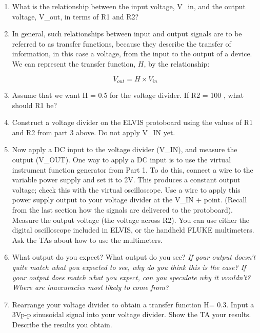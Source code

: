 \documentclass{article}
\begin{document}
\begin{enumerate}
	\item What is the relationship between the input voltage, V\_in, and the output voltage, V\_out, in terms of R1 and R2?
	\item In general, such relationships between input and output signals are to be referred to as transfer functions, because they describe the transfer of information, in this case a voltage, from the input to the output of a device. We can represent the transfer function, $H$, by the relationship:

		$$V_{out} = H \times V_{in}$$
		
	\item Assume that we want H = 0.5 for the voltage divider. If R2 = 100 \textOmega, what should R1 be?
	\item Construct a voltage divider on the ELVIS protoboard using the values of R1 and R2 from part 3 above. Do not apply V\_IN yet.
	\item Now apply a DC input to the voltage divider (V\_IN), and measure the output (V\_OUT). One way to apply a DC input is to use the virtual instrument function generator from Part 1. To do this, connect a wire to the variable power supply and set it to 2V. This produces a constant output voltage; check this with the virtual oscilloscope. Use a wire to apply this power supply output to your voltage divider at the V\_IN + point. (Recall from the last section how the signals are delivered to the protoboard). Measure the output voltage (the voltage across R2). You can use either the digital oscilloscope included in ELVIS, or the handheld FLUKE multimeters. Ask the TAs about how to use the multimeters.
	\item What output do you expect? What output do you see? \textit{If your output doesn’t quite match what you expected to see, why do you think this is the case? If your output does match what you expect, can you speculate why it wouldn’t? Where are inaccuracies most likely to come from?}
	\item Rearrange your voltage divider to obtain a transfer function H= 0.3. Input a 3Vp-p sinusoidal signal into your voltage divider. Show the TA your results. Describe the results you obtain.
\end{enumerate}
\end{document}
